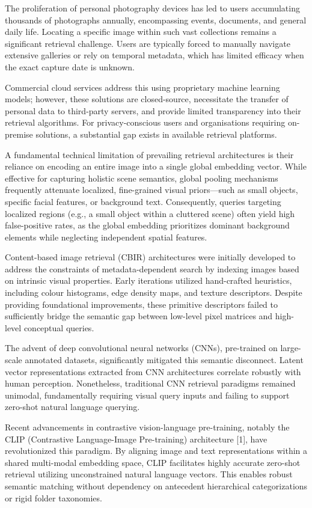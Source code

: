 \documentclass[12pt,a4paper,oneside]{report}
\begin{document}
The proliferation of personal photography devices has led to users accumulating thousands of photographs annually, encompassing events, documents, and general daily life. Locating a specific image within such vast collections remains a significant retrieval challenge. Users are typically forced to manually navigate extensive galleries or rely on temporal metadata, which has limited efficacy when the exact capture date is unknown.

Commercial cloud services address this using proprietary machine learning models; however, these solutions are closed-source, necessitate the transfer of personal data to third-party servers, and provide limited transparency into their retrieval algorithms. For privacy-conscious users and organisations requiring on-premise solutions, a substantial gap exists in available retrieval platforms.

A fundamental technical limitation of prevailing retrieval architectures is their reliance on encoding an entire image into a single global embedding vector. While effective for capturing holistic scene semantics, global pooling mechanisms frequently attenuate localized, fine-grained visual priors---such as small objects, specific facial features, or background text. Consequently, queries targeting localized regions (e.g., a small object within a cluttered scene) often yield high false-positive rates, as the global embedding prioritizes dominant background elements while neglecting independent spatial features.

Content-based image retrieval (CBIR) architectures were initially developed to address the constraints of metadata-dependent search by indexing images based on intrinsic visual properties. Early iterations utilized hand-crafted heuristics, including colour histograms, edge density maps, and texture descriptors. Despite providing foundational improvements, these primitive descriptors failed to sufficiently bridge the semantic gap between low-level pixel matrices and high-level conceptual queries.

The advent of deep convolutional neural networks (CNNs), pre-trained on large-scale annotated datasets, significantly mitigated this semantic disconnect. Latent vector representations extracted from CNN architectures correlate robustly with human perception. Nonetheless, traditional CNN retrieval paradigms remained unimodal, fundamentally requiring visual query inputs and failing to support zero-shot natural language querying.

Recent advancements in contrastive vision-language pre-training, notably the CLIP (Contrastive Language-Image Pre-training) architecture [1], have revolutionized this paradigm. By aligning image and text representations within a shared multi-modal embedding space, CLIP facilitates highly accurate zero-shot retrieval utilizing unconstrained natural language vectors. This enables robust semantic matching without dependency on antecedent hierarchical categorizations or rigid folder taxonomies.
\end{document}

